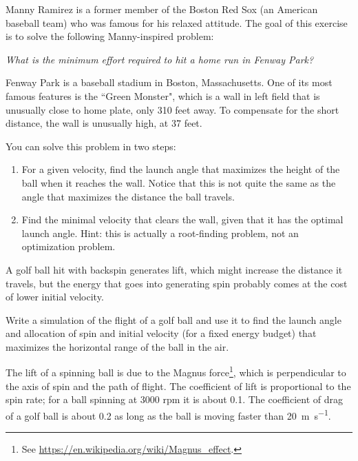 \documentclass[
]{book}
\numberwithin{Answer}{chapter}
\numberwithin{Exercise}{chapter}
\begin{document}
\begin{ex}
Manny Ramirez is a former member of the Boston Red Sox (an American baseball team) who was famous for his relaxed attitude.  The goal of this exercise is to solve the following Manny-inspired problem:

{\it What is the minimum effort required to hit a home run in Fenway Park?}

Fenway Park is a baseball stadium in Boston, Massachusetts.  One of its most famous features is the ``Green Monster", which is a wall in left field that is unusually close to home plate, only 310 feet away.  To compensate for the short distance, the wall is unusually high, at 37 feet.


You can solve this problem in two steps:

\begin{enumerate}

\item For a given velocity, find the launch angle that maximizes the height of the ball when it reaches the wall.  Notice that this is not quite the same as the angle that maximizes the distance the ball travels.


\item Find the minimal velocity that clears the wall, given that it has the optimal launch angle.  Hint: this is actually a root-finding problem, not an optimization problem.

\end{enumerate}

\end{ex}

\begin{ex}
\label{ex:golf}

A golf ball hit with backspin generates lift, which might increase the distance it travels, but the energy that goes into generating spin probably comes at the cost of lower initial velocity.

Write a simulation of the flight of a golf ball and use it to find
the launch angle and allocation of spin and initial velocity
(for a fixed energy budget) that maximizes the horizontal range of the
ball in the air.

The lift of a spinning ball is due to the Magnus force\footnote{See
\url{https://en.wikipedia.org/wiki/Magnus_effect}.}, which is
perpendicular to the axis of spin and the path of flight.  The
coefficient of lift is proportional to the spin rate; for a ball
spinning at 3000 rpm it is about 0.1.  The coefficient of drag of a
golf ball is about 0.2 as long as the ball is moving faster than \SI{20}{\meter\per\second}.

\end{ex}
\end{document}
